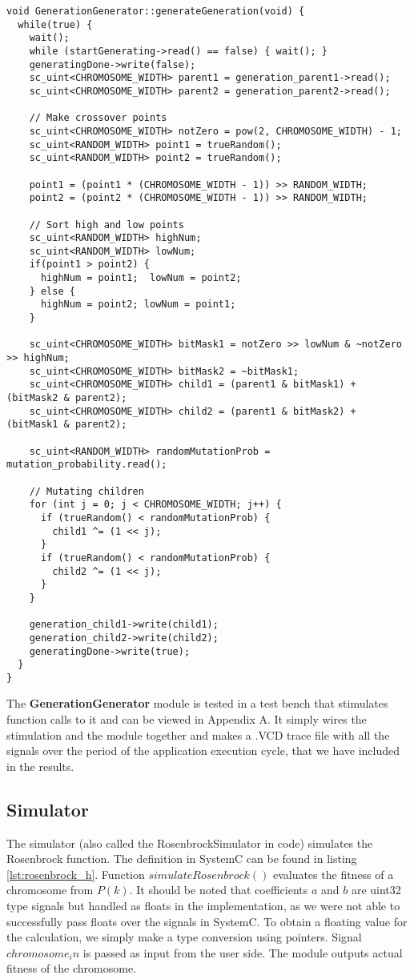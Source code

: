 \begin{lstlisting}[style=customc++,caption={GenerationGenerator.cpp},label={lst:generationgenerator_cpp}]
void GenerationGenerator::generateGeneration(void) { 
  while(true) {
    wait();	
    while (startGenerating->read() == false) { wait(); }
    generatingDone->write(false);
    sc_uint<CHROMOSOME_WIDTH> parent1 = generation_parent1->read();
    sc_uint<CHROMOSOME_WIDTH> parent2 = generation_parent2->read();

    // Make crossover points
    sc_uint<CHROMOSOME_WIDTH> notZero = pow(2, CHROMOSOME_WIDTH) - 1;
    sc_uint<RANDOM_WIDTH> point1 = trueRandom();
    sc_uint<RANDOM_WIDTH> point2 = trueRandom();

	point1 = (point1 * (CHROMOSOME_WIDTH - 1)) >> RANDOM_WIDTH;
	point2 = (point2 * (CHROMOSOME_WIDTH - 1)) >> RANDOM_WIDTH;
	
    // Sort high and low points
    sc_uint<RANDOM_WIDTH> highNum;
    sc_uint<RANDOM_WIDTH> lowNum;
    if(point1 > point2) {
      highNum = point1;  lowNum = point2;
    } else {
      highNum = point2; lowNum = point1;
    }
  
    sc_uint<CHROMOSOME_WIDTH> bitMask1 = notZero >> lowNum & ~notZero >> highNum;
    sc_uint<CHROMOSOME_WIDTH> bitMask2 = ~bitMask1;
    sc_uint<CHROMOSOME_WIDTH> child1 = (parent1 & bitMask1) + (bitMask2 & parent2);
    sc_uint<CHROMOSOME_WIDTH> child2 = (parent1 & bitMask2) + (bitMask1 & parent2);

    sc_uint<RANDOM_WIDTH> randomMutationProb = mutation_probability.read();

    // Mutating children
    for (int j = 0; j < CHROMOSOME_WIDTH; j++) {
      if (trueRandom() < randomMutationProb) {
        child1 ^= (1 << j);
      }
      if (trueRandom() < randomMutationProb) {
      	child2 ^= (1 << j);
      }
    }
    
    generation_child1->write(child1);
    generation_child2->write(child2);
    generatingDone->write(true);
  }
}
\end{lstlisting}

The \textbf{GenerationGenerator} module is tested in a test bench that stimulates function calls to it and can be viewed in Appendix A. It simply wires the stimulation and the module together and makes a .VCD trace file with all the signals over the period of the application execution cycle, that we have included in the results.

\subsection{Simulator}
The simulator (also called the RosenbrockSimulator in code) simulates the Rosenbrock function. The definition in SystemC can be found in listing \ref{lst:rosenbrock_h}. Function $simulateRosenbrock()$ evaluates the fitness of a chromosome from $P(k)$. It should be noted that coefficients $a$ and $b$ are uint32 type signals but handled as floats in the implementation, as we were not able to successfully pass floats over the signals in SystemC. To obtain a floating value for the calculation, we simply make a type conversion using pointers. Signal $chromosome_in$ is passed as input from the user side. The module outputs actual fitness of the chromosome.

